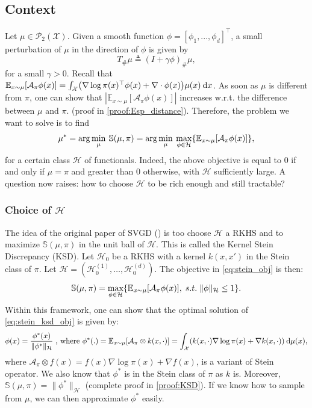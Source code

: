 \documentclass{article}
\newcommand{\E}{\mathbb{E}}
\renewcommand{\S}{\mathbb{S}}
\newcommand{\X}{\mathcal{X}}
\newcommand{\A}{\mathcal{A}}
\renewcommand{\P}{\mathcal{P}}
\renewcommand{\H}{\mathcal{H}}
\renewcommand{\S}{\mathbb{S}}
\renewcommand{\d}{\: \mathrm{d}}
\DeclarePairedDelimiter{\pare}{(}{)}
\DeclarePairedDelimiter{\bra}{\{}{\}}
\DeclarePairedDelimiter{\sq}{[}{]}
\begin{document}
\subsection{Context}
Let $\mu \in \P_2(\X)$. Given a smooth function $\phi = [\phi_1,...,\phi_d]^\top$, a small perturbation of $\mu$ in the direction of $\phi$ is given by 
\begin{equation}
    T_\#\mu \triangleq (I+\gamma \phi)_\#\mu,
\end{equation}
for a small $\gamma > 0$. \newline
Recall that $\E_{x \sim \mu}[\A_\pi \phi (x)] = \int_\X \pare*{ \nabla \log \pi(x)^\top \phi(x) + \nabla \cdot \phi(x) } \mu(x) \d x$. 
As soon as $\mu$ is different from $\pi$, one can show that $\left | \E_{x \sim \mu}[\A_\pi \phi (x)] \right |$ increases w.r.t. the difference between $\mu$ and $\pi$. (proof in \ref{proof:Esp_distance}). \newline
Therefore, the problem we want to solve is to find
\begin{equation}
  \mu^* = \arg\min_{\mu} \: \S(\mu, \pi) =
    \arg\min_{\mu} \: \max_{\phi \in \H} \bra*{ \E_{x \sim \mu}[\A_\pi \phi (x)] },
  \label{eq:stein_obj}
\end{equation}
for a certain class $\H$ of functionals.
Indeed, the above objective is equal to $0$ if and only if $\mu = \pi$ and greater than $0$ otherwise,
with $\H$ sufficiently large. A question now raises: how to choose $\H$ to be rich enough and
still tractable? \newline

\subsubsection{Choice of $\H$}\label{sec:RKHS}
The idea of the original paper of SVGD (\cite{Original-SVGD}) is too choose $\H$ a RKHS and
to maximize $\S(\mu, \pi)$ in the unit ball of $\H$. This is called the Kernel Stein Discrepancy (KSD). \newline
Let $\H_0$ be a RKHS with a kernel $k(x, x')$ in the Stein class of $\pi$.
Let $\H = (\H^{(1)}_0, \dots, \H^{(d)}_0)$.
The objective in \eqref{eq:stein_obj} is then:
\begin{equation}
  \S(\mu, \pi) =
    \max_{\phi \in \H} \bra*{ \E_{x \sim \mu}[\A_\pi \phi (x)], \; s.t. \; \|\phi\|_{\H} \leq 1 }.
  \label{eq:stein_ksd_obj}
\end{equation}
Within this framework, one can show that the optimal solution of \eqref{eq:stein_ksd_obj}
is given by:
\begin{equation}
  \phi(x) = \frac{\phi^*(x)}{\|\phi^*\|_{\H}}
    \text{ , where } \phi^*(.) = \E_{x \sim \mu}\sq*{ \A_\pi \otimes k(x, \cdot) }
                               = \int_\X (k(x, \cdot) \nabla \log \pi(x) + \nabla k(x, \cdot)) \d \mu(x),
  \label{eq:stein_ksd_sol}        
\end{equation}
where $\A_\pi \otimes f(x) =  f(x) \nabla \log \pi(x) + \nabla f(x)$, is a variant of Stein operator. We also know that $\phi^*$ is in the Stein class of $\pi$ as $k$ is.
Moreover, $\S(\mu, \pi) = \|\phi^*\|_\H$ (complete proof in \ref{proof:KSD}).
If we know how to sample from $\mu$, we can then approximate $\phi^*$ easily.
\end{document}

